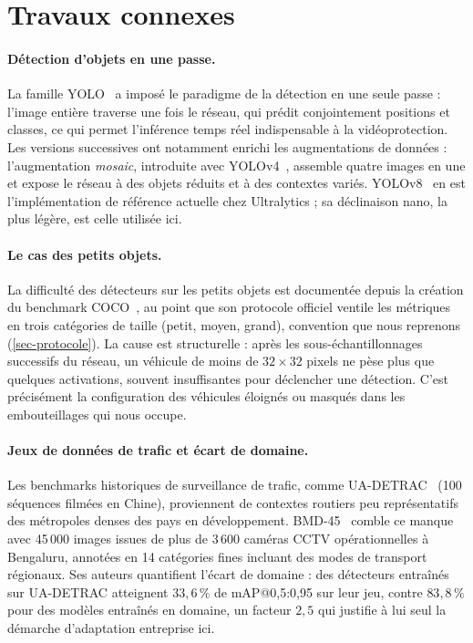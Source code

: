 \section{Travaux connexes}\label{sec-related}

\paragraph{Détection d'objets en une passe.}
La famille YOLO~\cite{redmon2016yolo} a imposé le paradigme de la
détection en une seule passe : l'image entière traverse une fois le
réseau, qui prédit conjointement positions et classes, ce qui permet
l'inférence temps réel indispensable à la vidéoprotection. Les versions
successives ont notamment enrichi les augmentations de données :
l'augmentation \emph{mosaic}, introduite avec
YOLOv4~\cite{bochkovskiy2020yolov4}, assemble quatre images en une et
expose le réseau à des objets réduits et à des contextes variés.
YOLOv8~\cite{yolov8_ultralytics} en est l'implémentation de référence
actuelle chez Ultralytics ; sa déclinaison nano, la plus légère, est
celle utilisée ici.

\paragraph{Le cas des petits objets.}
La difficulté des détecteurs sur les petits objets est documentée depuis
la création du benchmark COCO~\cite{lin2014coco}, au point que son
protocole officiel ventile les métriques en trois catégories de taille
(petit, moyen, grand), convention que nous reprenons
(\cref{sec-protocole}). La cause est structurelle : après les
sous-échantillonnages successifs du réseau, un véhicule de moins de
$32 \times 32$ pixels ne pèse plus que quelques activations, souvent
insuffisantes pour déclencher une détection. C'est précisément la
configuration des véhicules éloignés ou masqués dans les embouteillages
qui nous occupe.

\paragraph{Jeux de données de trafic et écart de domaine.}
Les benchmarks historiques de surveillance de trafic, comme
UA-DETRAC~\cite{wen2020uadetrac} (100 séquences filmées en Chine),
proviennent de contextes routiers peu représentatifs des métropoles
denses des pays en développement. BMD-45~\cite{sharma2026bmd45} comble
ce manque avec 45\,000 images issues de plus de 3\,600 caméras CCTV
opérationnelles à Bengaluru, annotées en 14 catégories fines incluant
des modes de transport régionaux. Ses auteurs quantifient l'écart de
domaine : des détecteurs entraînés sur UA-DETRAC atteignent $33{,}6\,\%$
de mAP@0,5:0,95 sur leur jeu, contre $83{,}8\,\%$ pour des modèles
entraînés en domaine, un facteur $2{,}5$ qui justifie à lui seul la
démarche d'adaptation entreprise ici.

